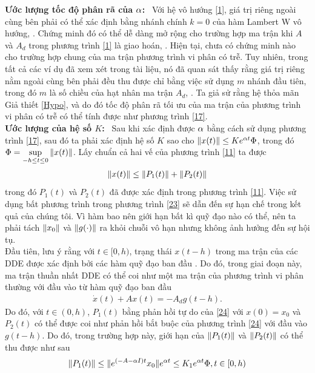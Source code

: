 \begin{cm} \textbf{Ước lượng tốc độ phân rã của $\alpha$:} \ 
	Với hệ vô hướng \eqref{1}, giá trị riêng ngoài cùng bên phải có thể xác định bằng nhánh chính $k =0$ của hàm Lambert W vô hướng, \cite{Shi06}. Chứng minh đó có thể dễ dàng mở rộng cho trường hợp ma trận khi $A$ và $A_d$ trong phương trình \eqref{1} là giao hoán, \cite{JahD07}. Hiện tại, chưa có chứng minh nào cho trường hợp chung của ma trận phương trình vi phân có trễ. Tuy nhiên, trong tất cả các ví dụ đã xem xét trong tài liệu,  nó đã quan sát thấy rằng giá trị riêng nằm ngoài cùng bên phải đều thu được chỉ bằng việc sử dụng $m$ nhánh đầu tiên, trong đó $m$ là số chiều của hạt nhân ma trận $A_d$, \cite{Yi10}. Ta giả sử rằng hệ thỏa mãn Giả thiết \ref{Hypo}, và do đó tốc độ phân rã tối ưu của ma trận của phương trình vi phân có trễ  có thể tính được như phương trình \eqref{17}.\\
\textbf{Ước lượng của hệ số $K$:} \ 
	Sau khi xác định được $\alpha$ bằng cách sử dụng phương trình \eqref{17}, sau đó ta phải xác định hệ số $K$ sao cho $\Vert x(t) \Vert \le K e^{\alpha t} \Phi$, trong đó $\Phi = \sup\limits_{-h \le t \le 0} \Vert x(t) \Vert$. 	Lấy chuẩn cả hai vế của phương trình \eqref{11} ta được
\begin{align}\label{23}
	\Vert x(t) \Vert \le \Vert P_1(t) \Vert + \Vert P_2(t)\Vert
\end{align}	
trong đó $P_1(t)$ và $P_2(t)$ đã được xác định trong phương trình \eqref{11}. Việc sử dụng bất phương trình trong phương trình \eqref{23} sẽ dẫn đến sự hạn chế  trong kết quả của chúng tôi. Vì hàm bao nên giới hạn bất kì quỹ đạo nào có thể, nên ta phải tách $\Vert x_0 \Vert$ và $\Vert g (\cdot) \Vert$ ra khỏi chuỗi vô hạn nhưng không ảnh hưởng đến sự hội tụ.\\
Đầu tiên, lưu ý rằng với $t \in [0,h)$,  trạng thái $x(t-h)$ trong ma trận của các DDE được xác định bởi các hàm quỹ đạo ban đầu . Do đó, trong giai đoạn này, ma trận thuần nhất DDE có thể coi như một ma trận của phương trình vi phân thường với đầu vào từ hàm quỹ đạo ban đầu 
\begin{align}\label{24}
	\dot{x}(t) + Ax(t) = -A_dg(t-h).
\end{align}
Do đó, với $t \in (0,h)$, $P_1(t)$ bằng phản hồi tự do của \eqref{24} với $x(0) =x_0$ và $P_2(t)$ có thể được coi như phản hồi bắt buộc của phương trình \eqref{24} với đầu vào $g(t-h)$. Do đó,  trong trường hợp này, giới hạn của $\Vert P_1(t) \Vert$ và $\Vert P_2(t) \Vert$ có thể thu được như sau
\begin{align}\label{25}
	\V P_1(t) \V \le \V e^{(-A - \a I)t}x_0 \V e^{\a t} \le K_1 e^{\a t}\Phi, t \in [0,h)

\end{align}
\end{cm}
